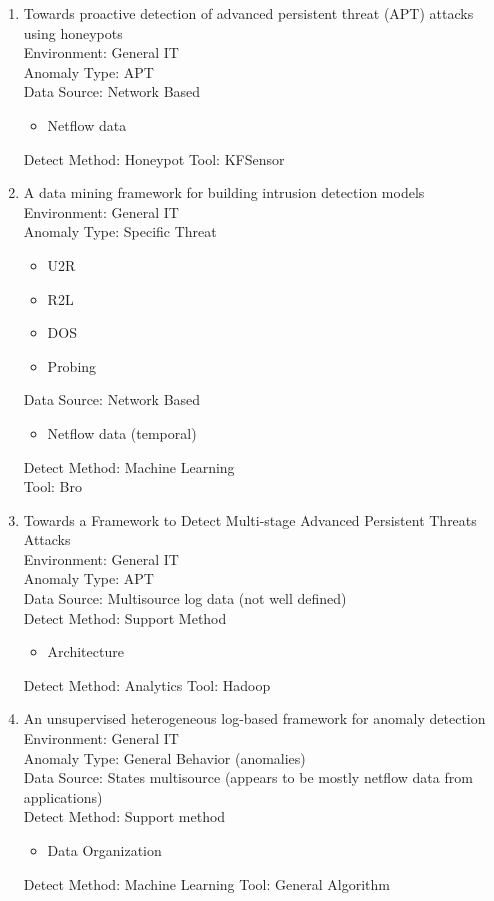 \documentclass[10pt]{IEEEtran}
\begin{document}
\begin{enumerate}
    \item
    Towards proactive detection of advanced persistent threat (APT) attacks using honeypots\cite{saud2015towards}\\
    Environment: General IT\\
    Anomaly Type: APT \\
    Data Source: Network Based
    \begin{itemize}
        \item Netflow data
    \end{itemize}
    Detect Method: Honeypot
    Tool: KFSensor
    
    \item
    A data mining framework for building intrusion detection models\cite{lee1999data}\\
    Environment: General IT\\
    Anomaly Type: Specific Threat
    \begin{itemize}
        \item U2R
        \item R2L
        \item DOS
        \item Probing
    \end{itemize}
    Data Source: Network Based
    \begin{itemize}
        \item Netflow data (temporal)
    \end{itemize}
    Detect Method: Machine Learning  \\
    Tool: Bro
    
    \item
    Towards a Framework to Detect Multi-stage Advanced Persistent Threats Attacks\cite{bhatt2014towards}\\
    Environment: General IT\\
    Anomaly Type:  APT\\
    Data Source:  Multisource log data (not well defined)\\
    Detect Method: Support Method
    \begin{itemize}
        \item Architecture
    \end{itemize}
    Detect Method: Analytics
    Tool: Hadoop
    
    \item
    An unsupervised heterogeneous log-based framework for anomaly detection\cite{hajamydeen2016unsupervised}\\
    Environment: General IT\\
    Anomaly Type: General Behavior (anomalies)\\
    Data Source: States multisource (appears to be mostly netflow data from applications)  \\
    Detect Method: Support method 
    \begin{itemize}
        \item Data Organization
    \end{itemize}
    Detect Method: Machine Learning
    Tool: General Algorithm
    

\end{enumerate}
\end{document}
